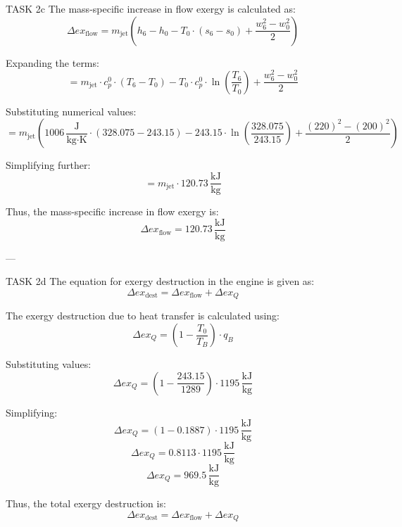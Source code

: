 TASK 2c  
The mass-specific increase in flow exergy is calculated as:  
\[
\Delta ex_{\text{flow}} = m_{\text{jet}} \left( h_6 - h_0 - T_0 \cdot (s_6 - s_0) + \frac{w_6^2 - w_0^2}{2} \right)
\]  

Expanding the terms:  
\[
= m_{\text{jet}} \cdot c_p^0 \cdot (T_6 - T_0) - T_0 \cdot c_p^0 \cdot \ln \left( \frac{T_6}{T_0} \right) + \frac{w_6^2 - w_0^2}{2}
\]  

Substituting numerical values:  
\[
= m_{\text{jet}} \left( 1006 \, \frac{\text{J}}{\text{kg·K}} \cdot (328.075 - 243.15) - 243.15 \cdot \ln \left( \frac{328.075}{243.15} \right) + \frac{(220)^2 - (200)^2}{2} \right)
\]  

Simplifying further:  
\[
= m_{\text{jet}} \cdot 120.73 \, \frac{\text{kJ}}{\text{kg}}
\]  

Thus, the mass-specific increase in flow exergy is:  
\[
\Delta ex_{\text{flow}} = 120.73 \, \frac{\text{kJ}}{\text{kg}}
\]  

---

TASK 2d  
The equation for exergy destruction in the engine is given as:  
\[
\Delta ex_{\text{dest}} = \Delta ex_{\text{flow}} + \Delta ex_Q
\]  

The exergy destruction due to heat transfer is calculated using:  
\[
\Delta ex_Q = \left( 1 - \frac{T_0}{T_B} \right) \cdot q_B
\]  

Substituting values:  
\[
\Delta ex_Q = \left( 1 - \frac{243.15}{1289} \right) \cdot 1195 \, \frac{\text{kJ}}{\text{kg}}
\]  

Simplifying:  
\[
\Delta ex_Q = \left( 1 - 0.1887 \right) \cdot 1195 \, \frac{\text{kJ}}{\text{kg}}
\]  
\[
\Delta ex_Q = 0.8113 \cdot 1195 \, \frac{\text{kJ}}{\text{kg}}
\]  
\[
\Delta ex_Q = 969.5 \, \frac{\text{kJ}}{\text{kg}}
\]  

Thus, the total exergy destruction is:  
\[
\Delta ex_{\text{dest}} = \Delta ex_{\text{flow}} + \Delta ex_Q
\]  

